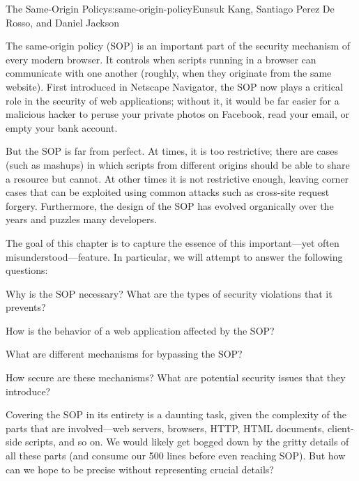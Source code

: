 \begin{aosachapter}{The Same-Origin Policy}{s:same-origin-policy}{Eunsuk Kang, Santiago Perez De Rosso, and Daniel Jackson}

\label{introduction}

The same-origin policy (SOP) is an important part of the security
mechanism of every modern browser. It controls when scripts running in a
browser can communicate with one another (roughly, when they originate
from the same website). First introduced in Netscape Navigator, the SOP
now plays a critical role in the security of web applications; without
it, it would be far easier for a malicious hacker to peruse your private
photos on Facebook, read your email, or empty your bank account.

But the SOP is far from perfect. At times, it is too restrictive; there
are cases (such as mashups) in which scripts from different origins
should be able to share a resource but cannot. At other times it is not
restrictive enough, leaving corner cases that can be exploited using
common attacks such as cross-site request forgery. Furthermore, the
design of the SOP has evolved organically over the years and puzzles
many developers.

The goal of this chapter is to capture the essence of this
important---yet often misunderstood---feature. In particular, we will
attempt to answer the following questions:

\begin{aosaitemize}

\item
  Why is the SOP necessary? What are the types of security violations
  that it prevents?
\item
  How is the behavior of a web application affected by the SOP?
\item
  What are different mechanisms for bypassing the SOP?
\item
  How secure are these mechanisms? What are potential security issues
  that they introduce?
\end{aosaitemize}

Covering the SOP in its entirety is a daunting task, given the
complexity of the parts that are involved---web servers, browsers, HTTP,
HTML documents, client-side scripts, and so on. We would likely get
bogged down by the gritty details of all these parts (and consume our
500 lines before even reaching SOP). But how can we hope to be precise
without representing crucial details?


\end{aosachapter}
